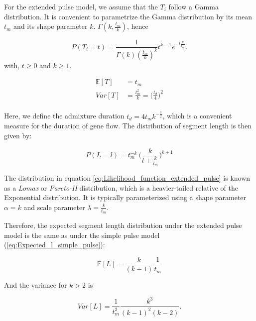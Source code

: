 \documentclass[]{article}
\begin{document}
For the extended pulse model, we assume that the $T_i$ follow a Gamma distribution. It is convenient to parametrize the Gamma distribution by its mean $t_m$ and its shape parameter $k$.  $\Gamma(k,\frac{t_m}{k})$, hence


\begin{equation}
\label{eq:RV_extended_pulse}
  P(T_i=t)=\frac{1}{\Gamma(k)(\frac{t_m}{k})^k}t^{k-1}e^{-t\frac{k}{t_m}}.
\end{equation} 
with, $t \geq 0$ and $k \geq 1$.

\begin{equation}
\begin{split}
\label{eq:RV_extended_pulse_properties}
\mathbb{E}[T]&=t_{m} \\
Var[T]&=\frac{t_{m}^2}{k} = \bigg(\frac{t_d}{4} \bigg)^2  \\
\end{split}
\end{equation}

Here, we define the admixture duration $t_d=4t_m k^{-\frac{1}{2}} $, which is a convenient measure for the duration of gene flow. The distribution of segment length is then given by:


\begin{equation}
\label{eq:Likelihood_function_extended_pulse}
    P(L=l) = t_{m}^{-k} \ \Bigg( \frac{k}{l+\frac{k}{t_{m}}}\Bigg)^{k+1}
\end{equation}

The distribution  in equation \ref{eq:Likelihood_function_extended_pulse} is known as a \emph{Lomax} or \emph{Pareto-II} distribution, which is a heavier-tailed relative of the Exponential distribution. It is typically parameterized using a shape parameter $\alpha=k$ and scale parameter $\lambda = \frac{k}{t_m}$. 


Therefore, the expected segment length distribution under the extended pulse model is the same as under the simple pulse model (\ref{eq:Expected_l_simple_pulse}):

\begin{equation}
\label{eq:Expected_l_extended_pulse}
\mathbb{E}[L] = \frac{k}{(k-1)}\frac{1}{t_{m}}
\end{equation}

And the variance for $k>2$ is 

\begin{equation}
\label{eq:Var_l_extended_pulse}
Var[L] = \frac{1}{t_m^2}\frac{k^3}{(k-1)^2 (k-2)}\text{.}
\end{equation}
\end{document}

